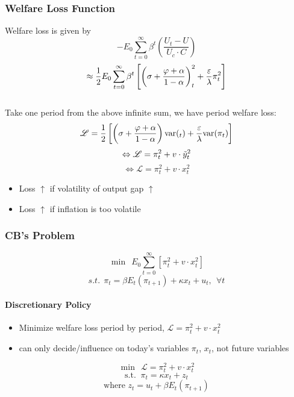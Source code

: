 \documentclass{article}
\begin{document}
\subsubsection{Welfare Loss Function}
Welfare loss is given by
$$-E_0 \sum_{t=0}^\infty \beta^t \left(\frac{U_t - U}{U_c\cdot C}\right)$$
$$\approx \frac{1}{2} E_0 \sum_{t=0}^\infty \beta^t \left[\left(\sigma + \frac{\varphi + \alpha}{1-\alpha}\right)\title{y}_t^2 + \frac{\varepsilon}{\lambda}\pi_t^2\right]$$
\\
Take one period from the above infinite sum, we have period welfare loss:
$$\mathscr{L} = \frac{1}{2} \left[\left(\sigma + \frac{\varphi + \alpha}{1-\alpha}\right)\text{var}(\title{y}_t) + \frac{\varepsilon}{\lambda}\text{var}(\pi_t)\right]$$
$$\Leftrightarrow \mathscr{L} = \pi_t^2 + v\cdot\Tilde{y}_t^2$$
$$\Leftrightarrow \mathscr{L} = \pi_t^2 + v\cdot x_t^2$$
\begin{itemize}
    \item Loss $\uparrow$ if volatility of output gap $\uparrow$
    \item Loss $\uparrow$ if inflation is too volatile
\end{itemize}

\subsubsection{CB's Problem}
$$\min\ \ E_0 \sum_{t=0}^\infty [\pi_t^2 + v\cdot x_t^2]$$
$$s.t.\ \ \pi_t = \beta E_t(\pi_{t+1}) + \kappa x_t + u_t,\ \ \forall t$$

\paragraph{Discretionary Policy}
\begin{itemize}
    \item Minimize welfare loss period by period, $\mathscr{L} = \pi_t^2 + v\cdot x_t^2$
    \item can only decide/influence on today's variables $\pi_t$, $x_t$, not future variables
\end{itemize}

$$\min\ \ \mathscr{L} = \pi_t^2 + v\cdot x_t^2$$
$$\text{s.t. }\ \pi_t = \kappa x_t + z_t$$
$$\text{where } z_t = u_t + \beta E_t(\pi_{t+1})$$
\end{document}
